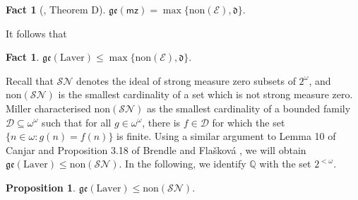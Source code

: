 \documentclass[12pt]{article}
\theoremstyle{definition}
\newtheorem{prp}[nummer]{\sc Proposition}
\newtheorem{fct}[nummer]{\sc Fact}
\begin{document}
\begin{fct}[\cite{brendle-between}, Theorem D]
$\mathfrak{ge}(\textsf{mz})=\max\{\text{non}(\mathcal{E}), \mathfrak{d}\}.$
\end{fct}

It follows that

\begin{fct}\label{fct:upperbound}
$\mathfrak{ge}(\text{Laver})\leq \max\{\text{non}(\mathcal{E}), \mathfrak{d}\}$.
\end{fct}

Recall that $\mathcal{SN}$ denotes the ideal of strong measure zero subsets of $2^{\omega}$, and $\text{non}(\mathcal{SN})$ is the smallest cardinality of a set which is not strong measure zero. Miller \cite{Miller81} characterised $\text{non}(\mathcal{SN})$ as the smallest cardinality of a bounded family $\mathcal{D}\subseteq\omega^\omega$ such that for all $g\in\omega^\omega$, there is $f\in\mathcal{D}$ for which the set $\{n\in\omega : g(n)=f(n)\}$ is finite. Using a similar argument to Lemma 10 of Canjar \cite{Canjar-gen} and Proposition 3.18 of Brendle and Fla\v{s}kov\'a \cite{brefla17}, we will obtain $\mathfrak{ge}(\text{Laver})\leq \text{non}(\mathcal{SN})$. In the following, we identify $\mathbb{Q}$ with the set $2^{<\omega}$.

\begin{prp}\label{prop:upperboundnon}
$\mathfrak{ge}(\text{Laver})\leq\text{non}(\mathcal{SN})$.
\end{prp}
\end{document}
